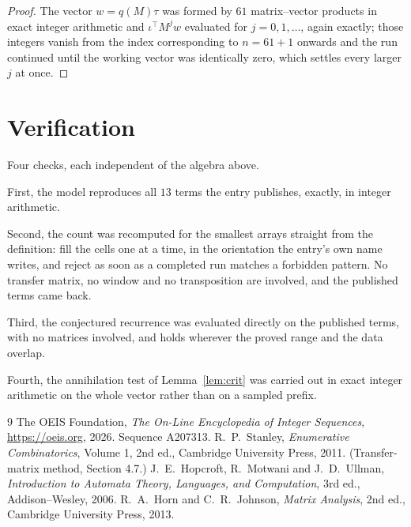 \documentclass[11pt,a4paper]{article}
\theoremstyle{plain}
\theoremstyle{definition}
\begin{document}
\begin{proof}
The vector $w=q(M)\tau$ was formed by $61$ matrix--vector products in exact integer
arithmetic and $\iota^{\!\top}M^{j}w$ evaluated for $j=0,1,\dots$, again exactly; those
integers vanish from the index corresponding to $n=61+1$ onwards and the run continued
until the working vector was identically zero, which settles every larger $j$ at once.
\end{proof}

\section{Verification}

Four checks, each independent of the algebra above.

First, the model reproduces all $13$ terms the entry publishes, exactly, in integer
arithmetic.

Second, the count was recomputed for the smallest arrays straight from the definition: fill the
cells one at a time, in the orientation the entry's own name writes, and reject as soon as a
completed run matches a forbidden pattern. No transfer matrix, no window and no transposition
are involved, and the published terms came back.

Third, the conjectured recurrence was evaluated directly on the published terms, with no
matrices involved, and holds wherever the proved range and the data overlap.

Fourth, the annihilation test of Lemma~\ref{lem:crit} was carried out in exact integer
arithmetic on the whole vector rather than on a sampled prefix.

\begin{thebibliography}{9}
 The OEIS Foundation, \emph{The On-Line Encyclopedia of Integer
Sequences}, \url{https://oeis.org}, 2026. Sequence A207313.
 R.~P.~Stanley, \emph{Enumerative Combinatorics}, Volume 1, 2nd ed.,
Cambridge University Press, 2011. (Transfer-matrix method, Section 4.7.)
 J.~E.~Hopcroft, R.~Motwani and J.~D.~Ullman, \emph{Introduction to Automata
Theory, Languages, and Computation}, 3rd ed., Addison--Wesley, 2006.
 R.~A.~Horn and C.~R.~Johnson, \emph{Matrix Analysis}, 2nd ed., Cambridge
University Press, 2013.
\end{thebibliography}
\end{document}
